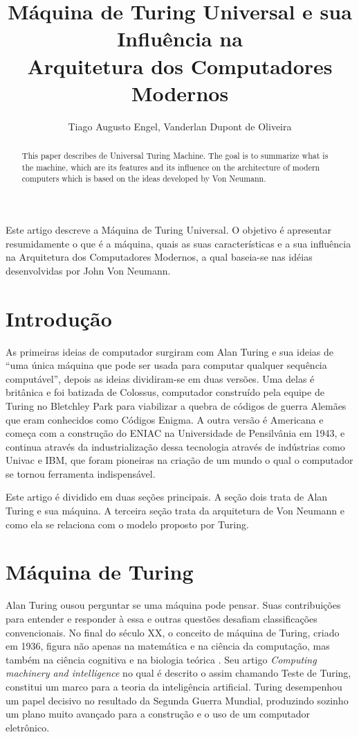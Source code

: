 \documentclass[12pt]{article}
\title{Máquina de Turing Universal e sua Influência na \\ Arquitetura dos Computadores Modernos \\}
\author{Tiago Augusto Engel\inst{1}, Vanderlan Dupont de Oliveira\inst{1}}
\begin{document}
 

\maketitle
\begin{resumo} 
 Este artigo descreve a Máquina de Turing Universal. O objetivo é apresentar resumidamente o que é a máquina, quais as suas características e a sua influência na Arquitetura dos Computadores Modernos, a qual baseia-se nas idéias desenvolvidas por John Von Neumann.
\end{resumo}

\begin{abstract}
This paper describes de Universal Turing Machine. The goal is to summarize what is the machine, which are its features and its influence on the architecture of modern computers which is based on the ideas developed by Von Neumann.
\end{abstract}
     

\section{Introdução}

As primeiras ideias de computador surgiram com Alan Turing e sua ideias de “uma única máquina que pode ser usada para computar qualquer sequência computável”, depois as ideias dividiram-se em duas versões. Uma delas é britânica e foi batizada de Colossus, computador construído pela equipe de Turing no Bletchley Park para viabilizar a quebra de códigos de guerra Alemães que eram conhecidos como Códigos Enigma. A outra versão é Americana e começa com a construção do ENIAC na Universidade de Pensilvânia em 1943, e continua através da industrialização dessa tecnologia através de indústrias como Univac e IBM, que foram pioneiras na criação de um mundo o qual o computador se tornou ferramenta indispensável.

Este artigo é dividido em duas seções principais. A seção dois trata de Alan Turing e sua máquina. A terceira seção trata da arquitetura de Von Neumann e como ela se relaciona com o modelo proposto por Turing.

\section{Máquina de Turing}

Alan Turing ousou perguntar se uma máquina pode pensar. Suas contribuições para entender e responder à essa e outras questões desafiam classificações convencionais. No final do século XX, o conceito de máquina de Turing, criado em 1936, figura não apenas na matemática e na ciência da computação, mas também na ciência cognitiva e na biologia teórica \cite{hodges1999}. Seu artigo \emph{Computing machinery and intelligence} \cite{Turing1950} no qual é descrito o assim chamando Teste de Turing, constitui um marco para a teoria da inteligência artificial. Turing desempenhou um papel decisivo no resultado da Segunda Guerra Mundial, produzindo sozinho um plano muito avançado para a construção e o uso de um computador eletrônico.
\end{document}
